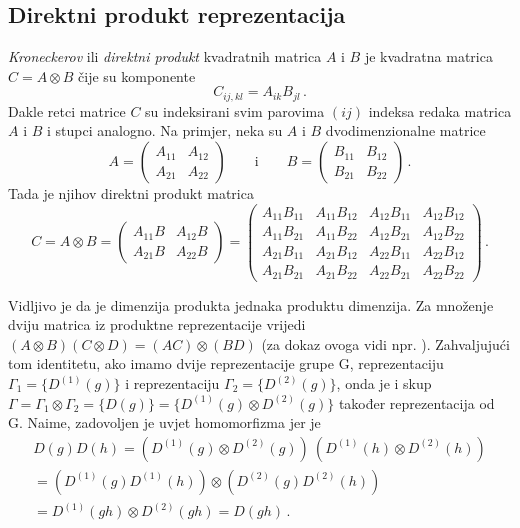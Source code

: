 \subsection*{Direktni produkt reprezentacija}
\emph{Kroneckerov} ili \emph{direktni produkt} kvadratnih matrica 
$A$ i $B$ je kvadratna matrica $C=A\otimes B$ čije su komponente
\begin{displaymath}
          C_{ij,kl}=A_{ik}B_{jl} \,.
\end{displaymath}
Dakle retci matrice $C$ su indeksirani svim parovima $(ij)$ indeksa
redaka matrica $A$ i $B$ i stupci analogno.
Na primjer, neka su $A$ i $B$ dvodimenzionalne matrice
\begin{displaymath}
A= \begin{pmatrix}
    A_{11} & A_{12} \\
    A_{21} & A_{22}
\end{pmatrix} \qquad \text{i} \qquad
B= \begin{pmatrix}
    B_{11} & B_{12} \\
    B_{21} & B_{22}
\end{pmatrix} \,.
\end{displaymath}
Tada je njihov direktni produkt matrica
\begin{displaymath}
C=A\otimes B= 
 \begin{pmatrix}
    A_{11} B & A_{12} B \\
    A_{21} B & A_{22} B
\end{pmatrix} =
\begin{pmatrix}
  A_{11}B_{11} & A_{11}B_{12} & A_{12}B_{11} & A_{12}B_{12} \\
  A_{11}B_{21} & A_{11}B_{22} & A_{12}B_{21} & A_{12}B_{22} \\
  A_{21}B_{11} & A_{21}B_{12} & A_{22}B_{11} & A_{22}B_{12} \\
  A_{21}B_{21} & A_{21}B_{22} & A_{22}B_{21} & A_{22}B_{22} 
\end{pmatrix} \,.
\end{displaymath}

Vidljivo je da je dimenzija produkta jednaka produktu dimenzija.
Za množenje dviju matrica iz produktne reprezentacije
vrijedi $(A\otimes B)(C\otimes D)=(AC)\otimes(BD)$
(za dokaz ovoga vidi npr. \cite{Jones:1998}).
Zahvaljujući tom identitetu, ako imamo dvije reprezentacije grupe G,
reprezentaciju $\Gamma_{1}=\{D^{(1)}(g)\}$
 i reprezentaciju $\Gamma_{2}=\{D^{(2)}(g)\}$,
onda je i skup $\Gamma=\Gamma_1 \otimes \Gamma_2 = \{D(g)\}=
\{D^{(1)}(g)\otimes D^{(2)}(g)\}$ također reprezentacija od G.
Naime, zadovoljen je uvjet homomorfizma jer je
\begin{multline*}
D(g)D(h)=(D^{(1)}(g)\otimes D^{(2)}(g))\: (D^{(1)}(h)\otimes
  D^{(2)}(h)) \\
  = (D^{(1)}(g)D^{(1)}(h))\otimes
 (D^{(2)}(g)D^{(2)}(h)) \\
 = D^{(1)}(gh)\otimes D^{(2)}(gh) = D(gh) \,.
\end{multline*}


